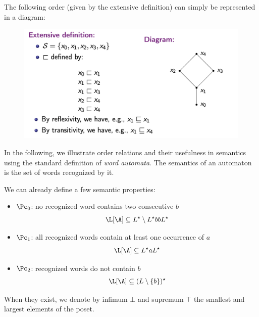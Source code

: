 \documentclass[toc, titlepaged]{../cs-classes/cs-classes}
\begin{document}
\begin{example}
    The following order (given by the extensive definition) can simply be represented in a diagram:
    \begin{figure}[H]
        \centering
        \includegraphics[scale=0.6]{images/hass-diagram.png}
    \end{figure}
\end{example}

In the following, we illustrate order relations and their usefulness in semantics using the standard definition of \emph{word automata}. The semantics of an automaton is the set of words recognized by it.

We can already define a few semantic properties:
\begin{itemize}
    \item $\Pc_0$: no recognized word contains two consecutive $b$
    \begin{equation*}
        \L[\A]\subseteq L^\star\setminus L^\star bb L^\star
    \end{equation*}
    \item $\Pc_1$: all recognized words contain at least one occurrence of $a$
    \begin{equation*}
        \L[\A]\subseteq L^\star aL^\star
    \end{equation*}
    \item $\Pc_2$: recognized words do not contain $b$
    \begin{equation*}
        \L[\A]\subseteq (L\setminus \{b\})^\star
    \end{equation*}
\end{itemize}

\begin{definition}[$\bot$, $\top$]
    When they exist, we denote by infimum $\bot$ and supremum $\top$ the smallest and largest elements of the poset.
\end{definition}
\end{document}
